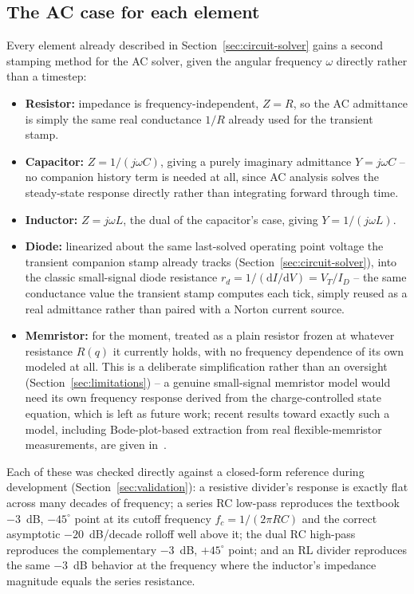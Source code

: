 \subsection{The AC case for each element}

Every element already described in Section~\ref{sec:circuit-solver} gains a second stamping
method for the AC solver, given the angular frequency $\omega$ directly rather than a timestep:
\begin{itemize}
\item \textbf{Resistor:} impedance is frequency-independent, $Z = R$, so the AC admittance is
simply the same real conductance $1/R$ already used for the transient stamp.
\item \textbf{Capacitor:} $Z = 1/(j\omega C)$, giving a purely imaginary admittance
$Y = j\omega C$ -- no companion history term is needed at all, since AC analysis solves the
steady-state response directly rather than integrating forward through time.
\item \textbf{Inductor:} $Z = j\omega L$, the dual of the capacitor's case, giving
$Y = 1/(j\omega L)$.
\item \textbf{Diode:} linearized about the same last-solved operating point voltage the
transient companion stamp already tracks (Section~\ref{sec:circuit-solver}), into the classic
small-signal diode resistance $r_d = 1/(\mathrm{d}I/\mathrm{d}V) = V_T/I_D$ -- the same
conductance value the transient stamp computes each tick, simply reused as a real admittance
rather than paired with a Norton current source.
\item \textbf{Memristor:} for the moment, treated as a plain resistor frozen at whatever
resistance $R(q)$ it currently holds, with no frequency dependence of its own modeled at all.
This is a deliberate simplification rather than an oversight (Section~\ref{sec:limitations}) --
a genuine small-signal memristor model would need its own frequency response derived from the
charge-controlled state equation, which is left as future work; recent results toward exactly
such a model, including Bode-plot-based extraction from real flexible-memristor
measurements, are given in~\cite{gater2026smallsignal,gater2025bodeplots}.
\end{itemize}
Each of these was checked directly against a closed-form reference during development
(Section~\ref{sec:validation}): a resistive divider's response is exactly flat across many
decades of frequency; a series RC low-pass reproduces the textbook $-3$~dB, $-45^\circ$ point at
its cutoff frequency $f_c = 1/(2\pi RC)$ and the correct asymptotic $-20$~dB/decade rolloff well
above it; the dual RC high-pass reproduces the complementary $-3$~dB, $+45^\circ$ point; and an
RL divider reproduces the same $-3$~dB behavior at the frequency where the inductor's impedance
magnitude equals the series resistance.

